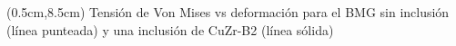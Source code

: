 \begin{frame}
{\begin{textblock*}{12.6cm}
\begin{figure}[htp]
      \end{figure}
    \end{textblock*}
    \begin{textblock*}{12cm}(0.5cm,8.5cm) 
    \centering
      Tensi\'on de Von Mises vs deformaci\'on para el BMG sin inclusi\'on (l\'inea punteada) y una inclusi\'on de CuZr-B2 (l\'inea s\'olida)
    \end{textblock*}
   }
\end{frame}


